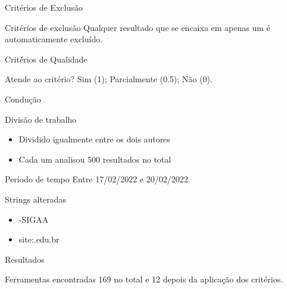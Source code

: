 \begin{frame}{{\sffamily Critérios de Exclusão}}
    \begin{block}{Critérios de exclusão}
    Qualquer resultado que se encaixa em apenas um é automaticamente excluído.
\end{block}
        
\end{frame}

\begin{frame}{{\sffamily Critérios de Qualidade}}
        \begin{block}{Atende ao critério?}
    Sim (1); Parcialmente (0.5); Não (0).
\end{block}
        
\end{frame}

\begin{frame}{{\sffamily Condução}}
    \begin{block}{Divisão de trabalho}
    \begin{itemize}
        \item Dividido igualmente entre os dois autores
        \item Cada um analisou 500 resultados no total
    \end{itemize}
\end{block}
\begin{block}{Período de tempo}
Entre 17/02/2022 e 20/02/2022.
\end{block}
\begin{block}{Strings alteradas}
\begin{itemize}
    \item -SIGAA
    \item site:.edu.br
\end{itemize}
\end{block}
\end{frame}

\begin{frame}{{\sffamily Resultados}}
    \begin{block}{Ferramentas encontradas}
        169 no total e 12 depois da aplicação dos critérios.
\end{block}

\end{frame}

